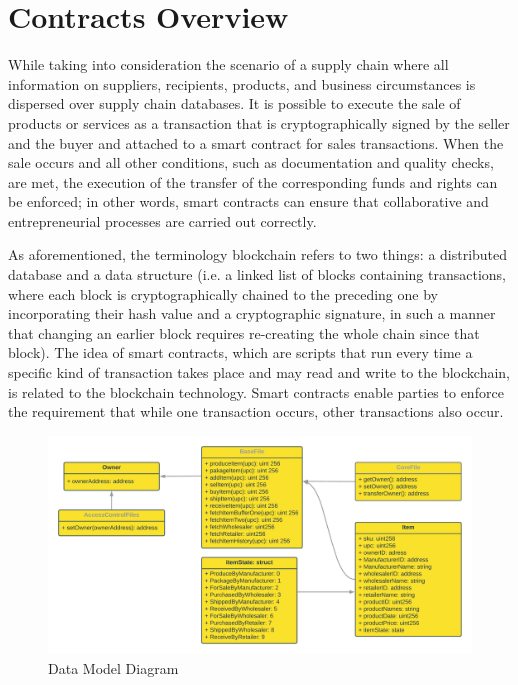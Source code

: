 \section{Contracts Overview}   

While taking into consideration the scenario of a supply chain where all information on suppliers, recipients, products, and business circumstances is dispersed over supply chain databases.
It is possible to execute the sale of products or services as a transaction that is cryptographically signed by the seller and the buyer and attached to a smart contract for sales transactions. When the sale occurs and all other conditions, such as documentation and quality checks, are met, the execution of the transfer of the corresponding funds and rights can be enforced; in other words, smart contracts can ensure that collaborative and entrepreneurial processes are carried out correctly.

\vspace{.5cm}

As aforementioned, the terminology blockchain refers to two things: a distributed database and a data structure (i.e. a linked list of blocks containing transactions, where each block is cryptographically chained to the preceding one by incorporating their hash value and a cryptographic signature, in such a manner that changing an earlier block requires re-creating the whole chain since that block). The idea of smart contracts, which are scripts that run every time a specific kind of transaction takes place and may read and write to the blockchain, is related to the blockchain technology. Smart contracts enable parties to enforce the requirement that while one transaction occurs, other transactions also occur.

    \begin{figure}[h]
    \centering
      \includegraphics[width=15cm]{includes/figures/Data Model diagram.png} 
      \caption{Data Model Diagram}
      \label{Data Model diagram}
    \end{figure}
    
